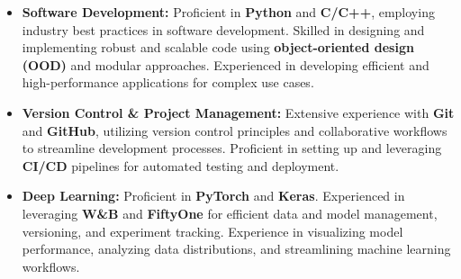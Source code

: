 \documentclass[10pt]{res}
\begin{document}
\begin{resume}



\begin{itemize} \itemsep 1pt

\item {\bf Software Development:} Proficient in \textbf{Python} and \textbf{C/C++}, employing industry best practices in software development. Skilled in designing and implementing robust and scalable code using \textbf{object-oriented design (OOD)} and modular approaches. Experienced in developing efficient and high-performance applications for complex use cases.

\item {\bf Version Control \& Project Management:} Extensive experience with \textbf{Git} and \textbf{GitHub}, utilizing version control principles and collaborative workflows to streamline development processes. Proficient in setting up and leveraging \textbf{CI/CD} pipelines for automated testing and deployment.

\item {\bf Deep Learning:} Proficient in \textbf{PyTorch} and \textbf{Keras}. Experienced in leveraging \textbf{W\&B} and \textbf{FiftyOne} for efficient data and model management, versioning, and experiment tracking. Experience in visualizing model performance, analyzing data distributions, and streamlining machine learning workflows.


\end{itemize}
\end{resume}
\end{document}
